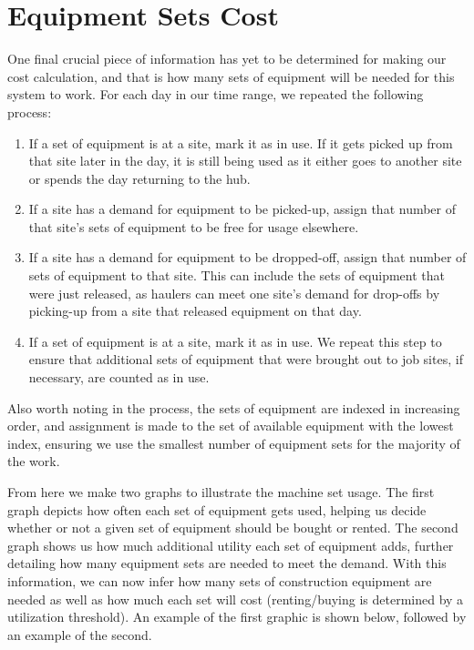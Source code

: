 \documentclass[letterpaper,10pt,english]{sphinxmanual}
\begin{document}
\section{Equipment Sets Cost}
\label{\detokenize{reporting:equipment-sets-cost}}
One final crucial piece of information has yet to be determined for making
our cost calculation, and that is how many sets of equipment will be needed
for this system to work. For each day in our time range, we repeated the
following process:
\begin{enumerate}
\item {} 
If a set of equipment is at a site, mark it as in use. If it gets
picked up from that site later in the day, it is still being used as it
either goes to another site or spends the day returning to the hub.

\item {} 
If a site has a demand for equipment to be picked-up, assign that
number of that site's sets of equipment to be free for usage elsewhere.

\item {} 
If a site has a demand for equipment to be dropped-off, assign that
number of sets of equipment to that site. This can include
the sets of equipment that were just released, as haulers can meet one
site's demand for drop-offs by picking-up from a site that released
equipment on that day.

\item {} 
If a set of equipment is at a site, mark it as in use. We repeat this
step to ensure that additional sets of equipment that were brought out
to job sites, if necessary, are counted as in use.

\end{enumerate}

Also worth noting in the process, the sets of equipment are indexed in
increasing order, and assignment is made to the set of available equipment
with the lowest index, ensuring we use the smallest number of equipment sets
for the majority of the work.

From here we make two graphs to illustrate the machine set usage. The first
graph depicts how often each set of equipment gets used, helping us decide
whether or not a given set of equipment should be bought or rented. The
second graph shows us how much additional utility each set of equipment adds,
further detailing how many equipment sets are needed to meet the demand. With
this information, we can now infer how many sets of construction equipment
are needed as well as how much each set will cost (renting/buying is determined
by a utilization threshold). An example of the first graphic is shown below,
followed by an example of the second.
\end{document}

